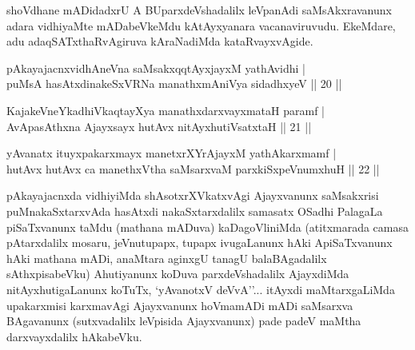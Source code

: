 \begin{artha}
shoVdhane mADidadxrU A BUparxdeVshadalilx leVpanAdi saMsAkxravanunx adara vidhiyaMte mADabeVkeMdu kAtAyxyanara vacanaviruvudu. EkeMdare, adu adaqSATxthaRvAgiruva kAraNadiMda kataRvayxvAgide.
\end{artha}

\begin{shl}
\footnotemark[1]pAkayajacnxvidhAneVna saMsakxqqtAyx\s \s jayxM yathAvidhi | \\
\footnotemark[2]puMsA hasAtxdinakeSxVRNa manathxmAniVya sidadhxyeV \hfill|| 20 || 
\end{shl}

\begin{shl}
\footnotemark[3]KajakeVneYkadhiVkaqtayXya manathxdarxvayxmataH paramf | \\
AvApasAthxna Ajayxsayx hutAvx \footnotemark[4]nitAyxhutiVsatxtaH \hfill|| 21 || 
\end{shl}

\begin{shl}
\footnotemark[5]yAvanatx ituyxpakarxmayx manetxrXYrAjayxM yathAkarxmamf | \\
hutAvx hutAvx ca manethxV\s tha saMsarxvaM parxkiSxpeVnumxhuH \hfill|| 22 || 
\end{shl}

\begin{artha}
pAkayajacnxda vidhiyiMda shAsotxrXVkatxvAgi Ajayxvanunx saMsakxrisi puMnakaSxtarxvAda hasAtxdi nakaSxtarxdalilx samasatx OSadhi PalagaLa piSaTxvanunx taMdu (mathana mADuva) kaDagoVliniMda (atitxmarada camasa pAtarxdalilx mosaru, jeVnutupapx, tupapx ivugaLanunx hAki ApiSaTxvanunx hAki mathana mADi, anaMtara aginxgU tanagU balaBAgadalilx sAthxpisabeVku) Ahutiyanunx koDuva parxdeVshadalilx AjayxdiMda nitAyxhutigaLanunx koTuTx, `yAvanotxV deVvA''... itAyxdi maMtarxgaLiMda upakarxmisi karxmavAgi Ajayxvanunx hoVmamADi mADi saMsarxva BAgavanunx (sutxvadalilx leVpisida Ajayxvanunx) pade padeV maMtha darxvayxdalilx hAkabeVku.
\end{artha}

